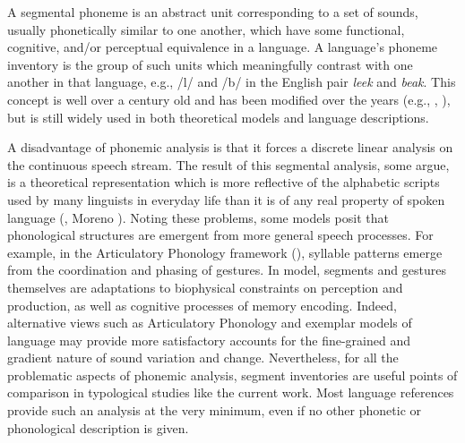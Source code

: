   A segmental phoneme is an abstract unit corresponding to a set of sounds, usually phonetically similar to one another, which have some functional, cognitive, and/or perceptual equivalence in a language. A language’s phoneme inventory is the group of such units which meaningfully contrast with one another in that language, e.g., /l/ and /b/ in the English pair \textit{leek} and \textit{beak}. This concept is well over a century old and has been modified over the years (e.g., \citealt{Sapir1925}, \citealt{ChomskyHalle1968}), but is still widely used in both theoretical models and language descriptions. 

  A disadvantage of phonemic analysis is that it forces a discrete linear analysis on the continuous speech stream. The result of this segmental analysis, some argue, is a theoretical representation which is more reflective of the alphabetic scripts used by many linguists in everyday life than it is of any real property of spoken language (\citealt{Port2006}, Moreno \citealt{Cabrera2008}). Noting these problems, some models posit that phonological structures are emergent from more general speech processes. For example, in the Articulatory Phonology framework (\citealt{BrowmanGoldstein1992b}), syllable patterns emerge from the coordination and phasing of gestures. In  model, segments and gestures themselves are adaptations to biophysical constraints on perception and production, as well as cognitive processes of memory encoding. Indeed, alternative views such as Articulatory Phonology and exemplar models of language \citep{Bybee2001} may provide more satisfactory accounts for the fine-grained and gradient nature of sound variation and change. Nevertheless, for all the problematic aspects of phonemic analysis, segment inventories are useful points of comparison in typological studies like the current work. Most language references provide such an analysis at the very minimum, even if no other phonetic or phonological description is given.

